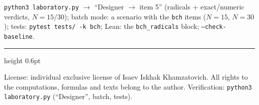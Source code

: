 \documentclass[11pt,a4paper]{article}
\theoremstyle{plain}
\theoremstyle{definition}
\theoremstyle{remark}
\begin{document}
\begin{verifybox}
\texttt{python3 laboratory.py} $\to$ ``Designer $\to$ item 5''
(radicals + exact/numeric verdicts, $N=15/30$); batch mode:
a scenario with the \texttt{bch} items ($N=15$, $N=30$);
tests: \texttt{pytest tests/ -k bch}; Lean: the
\texttt{bch\_radicals} block; \texttt{--check-baseline}.
\end{verifybox}

\vfill
{\color{linkblue}\hrule height 0.6pt}
\vspace{0.5em}
{\small\color{gray}
License: individual exclusive license of Isaev Iskhak Khamzatovich.
All rights to the computations, formulas and texts belong to the author.
Verification: \texttt{python3 laboratory.py} (``Designer'', batch, tests).
}
\end{document}
